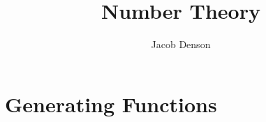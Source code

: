 

\DeclareMathOperator{\Dom}{Dom}

\title{Number Theory}
\author{Jacob Denson}




\maketitle

\tableofcontents


\chapter{Generating Functions}


